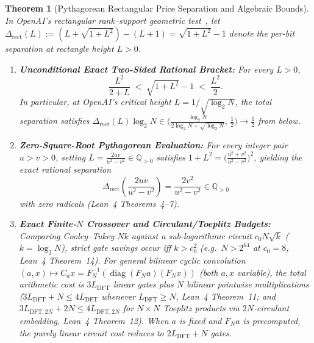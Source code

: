 \documentclass[11pt,a4paper]{article}
\newtheorem{theorem}{Theorem}[section]
\theoremstyle{definition}
\theoremstyle{remark}
\newcommand{\QQ}{\mathbb{Q}}
\newcommand{\diag}{\operatorname{diag}}
\begin{document}
\begin{theorem}[Pythagorean Rectangular Price Separation and Algebraic Bounds]\label{thm:pyth}
In OpenAI's rectangular rank--support geometric test~\cite{openai2026dft}, let $\Delta_{\mathrm{rect}}(L) := (L + \sqrt{1+L^2}) - (L+1) = \sqrt{1+L^2} - 1$ denote the per-bit separation at rectangle height $L > 0$.
\begin{enumerate}[leftmargin=1.8em,itemsep=2pt]
  \item \textbf{Unconditional Exact Two-Sided Rational Bracket:} For every $L > 0$,
  \begin{equation}\label{eq:rect-bracket}
    \frac{L^2}{2 + L} \;<\; \sqrt{1 + L^2} - 1 \;<\; \frac{L^2}{2}.
  \end{equation}
  In particular, at OpenAI's critical height $L = 1/\sqrt{\log_2 N}$, the total separation satisfies $\Delta_{\mathrm{rect}}(L)\log_2 N \in \bigl(\frac{\log_2 N}{2\log_2 N + \sqrt{\log_2 N}},\, \frac{1}{2}\bigr) \to \frac{1}{2}$ from below.
  \item \textbf{Zero-Square-Root Pythagorean Evaluation:} For every integer pair $u > v > 0$, setting $L = \frac{2uv}{u^2 - v^2} \in \QQ_{>0}$ satisfies $1 + L^2 = \bigl(\frac{u^2 + v^2}{u^2 - v^2}\bigr)^2$, yielding the exact rational separation
  \begin{equation}\label{eq:pyth-exact}
    \Delta_{\mathrm{rect}}\!\left(\frac{2uv}{u^2 - v^2}\right) = \frac{2 v^2}{u^2 - v^2} \in \QQ_{>0}
  \end{equation}
  with zero radicals (Lean~4 Theorems~4--7).
  \item \textbf{Exact Finite-$N$ Crossover and Circulant/Toeplitz Budgets:} Comparing Cooley--Tukey $N k$ against a sub-logarithmic circuit $c_0 N \sqrt{k}$ ($k = \log_2 N$), strict gate savings occur iff $k > c_0^2$ (e.g.\ $N > 2^{64}$ at $c_0 = 8$, Lean~4 Theorem~14). For general bilinear cyclic convolution $(a, x) \mapsto C_a x = F_N^{-1}(\diag(F_N a)(F_N x))$ (both $a, x$ variable), the total arithmetic cost is $3 L_{\mathrm{DFT}}$ linear gates plus $N$ bilinear pointwise multiplications ($3 L_{\mathrm{DFT}} + N \le 4 L_{\mathrm{DFT}}$ whenever $L_{\mathrm{DFT}} \ge N$, Lean~4 Theorem~11; and $3 L_{\mathrm{DFT}, 2N} + 2N \le 4 L_{\mathrm{DFT}, 2N}$ for $N\times N$ Toeplitz products via $2N$-circulant embedding, Lean~4 Theorem~12). When $a$ is fixed and $F_N a$ is precomputed, the purely linear circuit cost reduces to $2 L_{\mathrm{DFT}} + N$ gates.
\end{enumerate}
\end{theorem}
\end{document}
